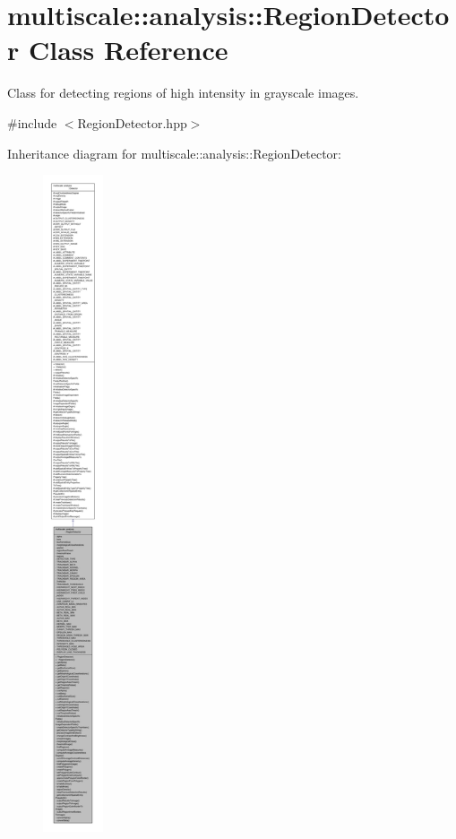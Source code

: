 \hypertarget{classmultiscale_1_1analysis_1_1RegionDetector}{\section{multiscale\-:\-:analysis\-:\-:Region\-Detector Class Reference}
\label{classmultiscale_1_1analysis_1_1RegionDetector}
}


Class for detecting regions of high intensity in grayscale images.  




{\ttfamily \#include $<$Region\-Detector.\-hpp$>$}



Inheritance diagram for multiscale\-:\-:analysis\-:\-:Region\-Detector\-:\nopagebreak
\begin{figure}[H]
\begin{center}
\leavevmode
\includegraphics[height=550pt]{classmultiscale_1_1analysis_1_1RegionDetector__inherit__graph}
\end{center}
\end{figure}


